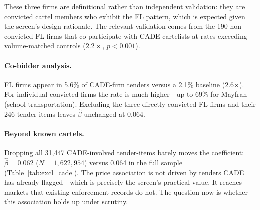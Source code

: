 These three firms are definitional rather than independent validation:
they are convicted cartel members who exhibit the FL pattern, which is
expected given the screen's design rationale. The relevant validation
comes from the 190 non-convicted FL firms that co-participate with
CADE cartelists at rates exceeding volume-matched controls
($2.2\times$, $p < 0.001$).

\paragraph{Co-bidder analysis.}
FL firms appear in 5.6\% of CADE-firm tenders versus a 2.1\% baseline
(2.6$\times$). For individual convicted firms the rate is much
higher---up to 69\% for Mayfran (school transportation). Excluding
the three directly convicted FL firms and their 246 tender-items
leaves $\hat{\beta}$ unchanged at 0.064.

\paragraph{Beyond known cartels.}
Dropping all 31,447 CADE-involved tender-items barely moves the
coefficient: $\hat{\beta} = 0.062$ ($N = 1{,}622{,}954$) versus
0.064 in the full sample (Table~\ref{tab:excl_cade}). The price association is not driven by tenders CADE has already
flagged---which is precisely the screen's practical value. It reaches
markets that existing enforcement records do not. The question now
is whether this association holds up under scrutiny.

